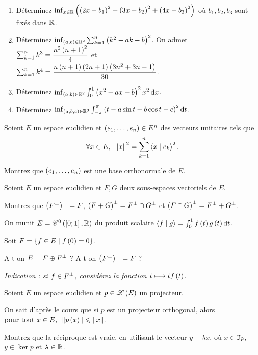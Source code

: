\begin{exoss}
\begin{enumerate}
    \item Déterminez \(\inf_{x\in\mathbb{R}}\left(\left(2x-b_1\right)^2+\left(3x-b_2\right)^2+\left(4x-b_3\right)^2\right)\) où \(b_1,b_2,b_3\) sont fixés dans \(\mathbb{R}\). \\
    \item Déterminez \(\inf_{\left(a,b\right)\in\mathbb{R}^2}\sum_{k=1}^n\left(k^2-ak-b\right)^2\). On admet \(\sum_{k=1}^nk^3=\dfrac{n^2\left(n+1\right)^2}{4}\) et \\ \(\sum_{k=1}^nk^4=\dfrac{n\left(n+1\right)\left(2n+1\right)\left(3n^2+3n-1\right)}{30}\). \\
    \item Déterminez \(\inf_{\paren{a,b}\in\R^2}\int_0^1\paren{x^2-ax-b}^2x^2\odif{x}\). \\
    \item Déterminez \(\inf_{\paren{a,b,c}\in\R^3}\int_{-\pi}^\pi\paren{t-a\sin t-b\cos t-c}^2\odif{t}\).
\end{enumerate}
\end{exoss}

\begin{exoss}
Soient \(E\) un espace euclidien et \(\left(e_1,\dots,e_n\right)\in E^n\) des vecteurs unitaires tels que \[\quantifs{\forall x\in E}\norme{x}^2=\sum_{k=1}^n\ps{x}{e_k}^2.\]

Montrez que \(\left(e_1,\dots,e_n\right)\) est une base orthonormale de \(E\).
\end{exoss}

\begin{exoss}
Soient \(E\) un espace euclidien et \(F,G\) deux sous-espaces vectoriels de \(E\).

Montrez que \(\left(F^{\perp}\right)^{\perp}=F\), \(\left(F+G\right)^{\perp}=F^{\perp}\cap G^{\perp}\) et \(\left(F\cap G\right)^{\perp}=F^{\perp}+G^{\perp}\).
\end{exoss}

\begin{exosss}
On munit \(E=\mathscr{C}^{0}\left(\left[0;1\right],\mathbb{R}\right)\) du produit scalaire \(\ps{f}{g}=\int_0^1f\paren{t}g\paren{t}\odif{t}\).

Soit \(F=\left\lbrace f\in E\;\middle|\; f\left(0\right)=0\right\rbrace\).

A-t-on \(E=F\oplus F^{\perp}\) ? A-t-on \(\left(F^{\perp}\right)^{\perp}=F\) ?

\textit{Indication : si \(f\in F^{\perp}\), considérez la fonction \(t\longmapsto tf\left(t\right)\).}
\end{exosss}

\begin{exoss}
Soient \(E\) un espace euclidien et \(p\in\mathscr{L}\left(E\right)\) un projecteur.

On sait d'après le cours que si \(p\) est un projecteur orthogonal, alors \(\quantifs{\tpt x\in E}\norme{p\paren{x}}\leq\norme{x}\).

Montrez que la réciproque est vraie, en utilisant le vecteur \(y+\lambda x\), où \(x\in\Im p\), \(y\in\ker p\) et \(\lambda\in\mathbb{R}\).
\end{exoss}

